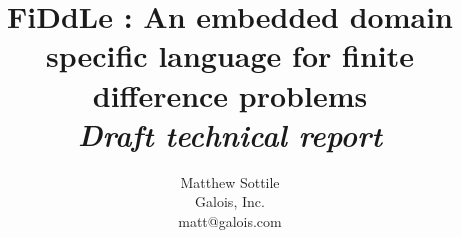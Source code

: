 \documentclass{article}
\newcommand{\FIDDLE}{FiDdLe{ }}
\begin{document}
\title{\FIDDLE: An embedded domain specific language for finite difference problems\\ \emph{Draft technical report}}

\author{Matthew Sottile\\Galois, Inc.\\matt@galois.com}
\date{}

\lstset{
  basicstyle=\footnotesize\ttfamily,
  language=C,
  breaklines=true,
  frame=single
}

\maketitle

%


% 





\end{document}
